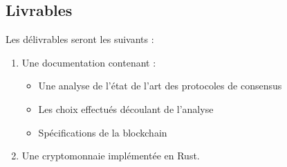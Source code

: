 \documentclass[../tb_report.tex]{subfiles}
\begin{document}
\subsection*{Livrables}
Les délivrables seront les suivants :
\begin{enumerate}
    \item Une documentation contenant :
    	\begin{itemize}
        	\item Une analyse de l'état de l'art des protocoles de consensus
        	\item Les choix effectués découlant de l'analyse
        	\item Spécifications de la blockchain
    	\end{itemize}
    \item Une cryptomonnaie implémentée en Rust.
\end{enumerate}
\end{document}
